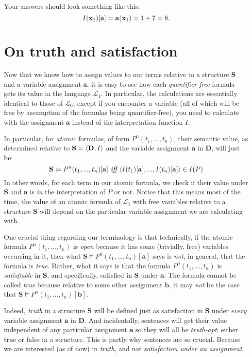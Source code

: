 \begin{remark}
Your answers should look something like this: 
\[
I(\mathbf{x}_{1})[\mathbf{a}]=\mathbf{a}(\mathbf{x}_{1})=1+7=8.
\]
\end{remark}

\section{On truth and satisfaction}

Now that we know how to assign values to our terms relative to a structure $\mathbf{S}$ and a variable assignment $\mathbf{a}$, it is easy to see how each \textit{quantifier-free} formula gets its value in the language $\mathcal{L}_1$. In particular, the calculations are essentially identical to those of $\mathcal{L}_0$, except if you encounter a variable (all of which will be free by assumption of the formulas being quantifier-free), you need to calculate with the assignment $\mathbf{a}$ instead of the interpretation function $I$. 

In particular, for \textit{atomic} formulas, of form $P^n(t_1, ..., t_n)$, their semantic value, as determined relative to $\mathbf{S}=\langle\mathbf{D}, I\rangle$ and the variable assignment $\mathbf{a}$ in $\mathbf{D}$, will just be:
\[
\mathbf{S}\models P^n(t_1, ..., t_n)[\mathbf{a}] \textit{ iff } \langle I(t_1)[\mathbf{a}], ..., I(t_n)[\mathbf{a}]\rangle \in I(P)
\]
In other words, for each term in our atomic formula, we check if their value under $\mathbf{S}$ and $\mathbf{a}$ is \textit{in} the interpretation of $P$ or not. Notice that this means most of the time, the value of an atomic formula of $\mathcal{L}_1$ with free variables relative to a structure $\mathbf{S}$ will depend on the particular variable assignment we are calculating with. 

One crucial thing regarding our terminology is that technically, if the atomic formula $P^n(t_1, ..., t_n)$ is \textit{open} because it has some (trivially, free) variables occurring in it, then what $\mathbf{S}\models P^n(t_1, ..., t_n)[\mathbf{a}]$ says is \textit{not}, in general, that the formula is \textit{true}. Rather, what it says is that the formula $P^n(t_1, ..., t_n)$ is \textit{satisfiable} in $\mathbf{S}$, and specifically, satisfied in $\mathbf{S}$ under $\mathbf{a}$. The formula cannot be called \textit{true} because relative to some other assignment $\mathbf{b}$, it may \textit{not} be the case that $\mathbf{S}\models P^n(t_1, ..., t_n)[\mathbf{b}]$. 

Indeed, \textit{truth} in a structure $\mathbf{S}$ will be defined just as satisfaction in $\mathbf{S}$ under \textit{every} variable assignment $\mathbf{a}$ in $\mathbf{D}$. And incidentally, sentences will get their value independent of any particular assignment $\mathbf{a}$ so they will all be \textit{truth-apt}; either true or false in a structure. This is partly why sentences are so crucial. Because we are interested (as of now) in \textit{truth}, and not \textit{satisfaction under an assignment}. 

